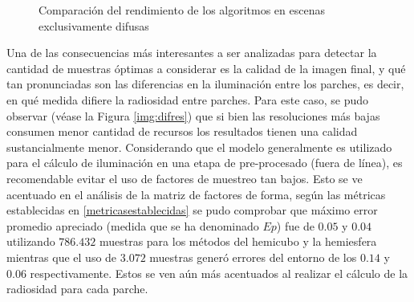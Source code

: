 \begin{figure}
\caption{Comparación del rendimiento de los algoritmos en escenas exclusivamente difusas}
\label{plot:emglc1}
\end{figure}

Una de las consecuencias más interesantes a ser analizadas para detectar la cantidad de muestras óptimas a considerar es la calidad de la imagen final, y qué tan pronunciadas son las diferencias en la iluminación entre los parches, es decir, en qué medida difiere la radiosidad entre parches. Para este caso, se pudo observar (véase la Figura \ref{img:difres}) que si bien las resoluciones más bajas consumen menor cantidad de recursos los resultados tienen una calidad sustancialmente menor. Considerando que el modelo generalmente es utilizado para el cálculo de iluminación en una etapa de pre-procesado (fuera de línea), es recomendable evitar el uso de factores de muestreo tan bajos. Esto se ve acentuado en el análisis de la matriz de factores de forma, según las métricas establecidas en \ref{metricasestablecidas} se pudo comprobar que máximo error promedio apreciado (medida que se ha denominado $Ep$) fue de $0.05$ y $0.04$ utilizando $786.432$ muestras para los métodos del hemicubo y la hemiesfera mientras que el uso de $3.072$ muestras generó errores del entorno de los $0.14$ y $0.06$ respectivamente. Estos se ven aún más acentuados al realizar el cálculo de la radiosidad para cada parche.

